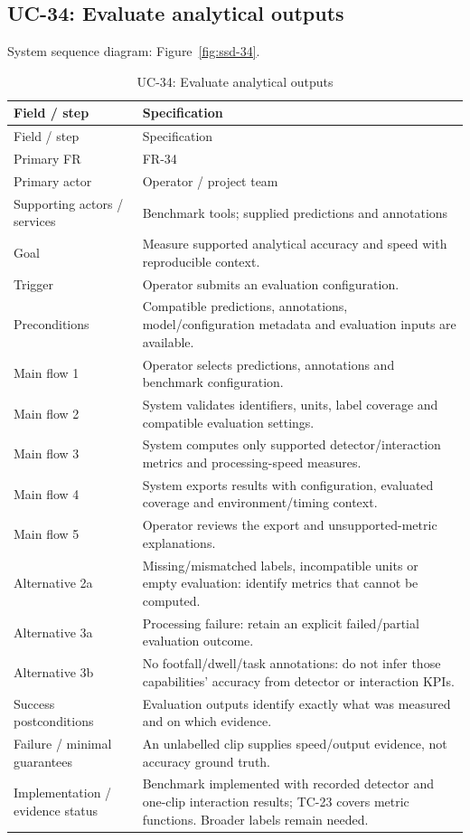 \subsection*{UC-34: Evaluate analytical outputs}
\label{uc:34}
System sequence diagram: Figure~\ref{fig:ssd-34}.

\begin{longtable}{P{0.23\textwidth}P{0.67\textwidth}}
\caption{UC-34: Evaluate analytical outputs}\\
\toprule
Field / step & Specification\\
\midrule
\endfirsthead
\toprule
Field / step & Specification\\
\midrule
\endhead
Primary FR & FR-34\\
Primary actor & Operator / project team\\
Supporting actors / services & Benchmark tools; supplied predictions and annotations\\
Goal & Measure supported analytical accuracy and speed with reproducible context.\\
Trigger & Operator submits an evaluation configuration.\\
Preconditions & Compatible predictions, annotations, model/configuration metadata and evaluation inputs are available.\\
Main flow 1 & Operator selects predictions, annotations and benchmark configuration.\\
Main flow 2 & System validates identifiers, units, label coverage and compatible evaluation settings.\\
Main flow 3 & System computes only supported detector/interaction metrics and processing-speed measures.\\
Main flow 4 & System exports results with configuration, evaluated coverage and environment/timing context.\\
Main flow 5 & Operator reviews the export and unsupported-metric explanations.\\
Alternative 2a & Missing/mismatched labels, incompatible units or empty evaluation: identify metrics that cannot be computed.\\
Alternative 3a & Processing failure: retain an explicit failed/partial evaluation outcome.\\
Alternative 3b & No footfall/dwell/task annotations: do not infer those capabilities' accuracy from detector or interaction KPIs.\\
Success postconditions & Evaluation outputs identify exactly what was measured and on which evidence.\\
Failure / minimal guarantees & An unlabelled clip supplies speed/output evidence, not accuracy ground truth.\\
Implementation / evidence status & Benchmark implemented with recorded detector and one-clip interaction results; TC-23 covers metric functions. Broader labels remain needed.\\
\bottomrule
\end{longtable}

